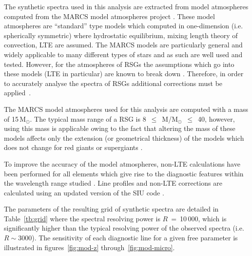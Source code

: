 


The synthetic spectra used in this analysis are extracted from model atmospheres computed from the MARCS model atmospheres project
\citep{1975A&A....42..407G,2008A&A...486..951G}.
These model atmospheres are ``standard'' type models which computed in one-dimension (i.e. spherically symmetric)
where hydrostatic equilibrium, mixing length theory of convection, LTE are assumed.
The MARCS models are particularly general and widely applicable to many different types of stars and as such are well used and tested.
However, for the atmospheres of RSGs the assumptions which go into these models (LTE in particular) are known to break down
\citep{2002AN....323..213F,2010ASPC..425..124P}.
Therefore, in order to accurately analyse the spectra of RSGs additional corrections must be applied~\citep{2012ApJ...751..156B}.

The MARCS model atmospheres used for this analysis are computed with a mass of 15\,M$_{\odot}$.
The typical mass range of a RSG is 8~$\leq$~M/M$_{\odot}$~$\leq$~40, however,
using this mass is applicable owing to the fact that altering the mass of these models affects only the extension
(or geometrical thickness) of the models which does not change for red giants or supergiants
\citep{2010MNRAS.407.1203D}.

To improve the accuracy of the model atmospheres,
non-LTE calculations have been performed for all elements which give rise to the diagnostic features within the wavelength range studied
\citep{2012ApJ...751..156B,2013ApJ...764..115B,2015ApJ...804..113B}.
Line profiles and non-LTE corrections are calculated using an updated version of the SIU code
\citep{1999PhDT.........3R,2012ApJ...751..156B}.

The parameters of the resulting grid of synthetic spectra are detailed in
Table~\ref{tb:grid} where the spectral resolving power is $R$~=~10\,000,
which is significantly higher than the typical resolving power of the observed spectra
(i.e. $R \sim 3000$).
The sensitivity of each diagnostic line for a given free parameter is illustrated in figures~\ref{fig:mod-z} through~\ref{fig:mod-micro}.

